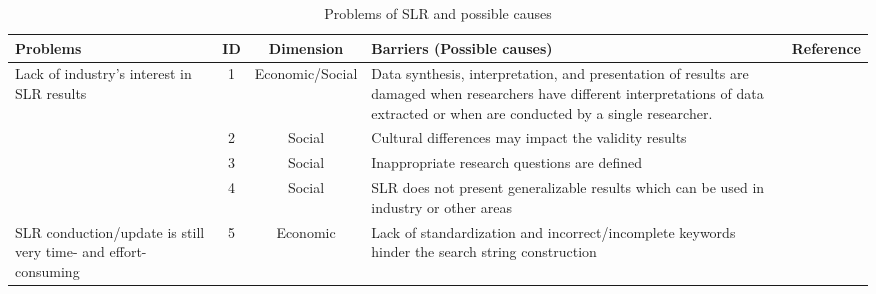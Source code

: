 


\begin{table*}[!ht]

\caption{Problems of SLR and possible causes}
\label{tab:problemsAndBarriers}
\footnotesize
\begin{tabular}{|p{1.6cm}|c|c|p{7.5cm}|p{2.2cm}|}
\hline
\centering \textbf{Problems} & \centering \textbf{ID} & \textbf{Dimension} & \centering \textbf{Barriers (Possible causes)} & \textbf{Reference} \\ \hline
\multirow{4}{*}{\begin{minipage}{1.6cm} \centering Lack of industry's interest in SLR results\end{minipage}} & 1 & Economic/Social & Data synthesis, interpretation, and presentation of results are damaged when researchers have different interpretations of data extracted or when are conducted by a single researcher.  & \cite{Ampatzoglou2019} \cite{Riaz2010} \cite{Zhou2016Threats} \\ \cline{2-5} 
 & 2 & Social & Cultural differences may impact the validity results & \cite{Riaz2010} \cite{Zhou2016Threats} \\ \cline{2-5} 
& 3 & Social & Inappropriate research questions are defined & \cite{Ampatzoglou2019} \cite{Imtiaz2013} \cite{Kitchenham2013} \cite{Riaz2010} \cite{Zhou2016Threats} \\ \cline{2-5} 
& 4 & Social & SLR does not present generalizable results which can be used in industry or other areas & \cite{Ampatzoglou2019}\cite{Budgen2018Reporting} \\ \hline
\multirow{7}{*}{\begin{minipage}{1.6cm} \centering SLR conduction/update is still very time- and effort-consuming \end{minipage}} & 5 & Economic & Lack of standardization and incorrect/incomplete keywords hinder the search string construction & \cite{Ampatzoglou2019}\cite{Imtiaz2013} \cite{Kitchenham2013}\cite{Riaz2010}\cite{Zhou2016Threats}\\ \cline{2-5} 


\end{tabular}
\end{table*}
